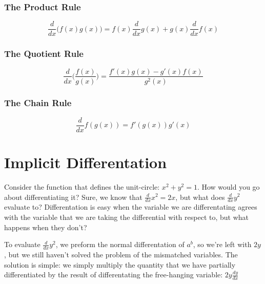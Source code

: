 \subsubsection{The Product Rule}
\begin{equation}
\frac{d}{dx}\big(f(x)g(x)\big)=f(x)\frac{d}{dx}g(x)+g(x)\frac{d}{dx}f(x)
\end{equation}

\subsubsection{The Quotient Rule}
\begin{equation}
\frac{d}{dx}\Bigg(\frac{f(x)}{g(x)}\Bigg)=\frac{f'(x)g(x)-g'(x)f(x)}{g^2(x)}
\end{equation}

\subsubsection{The Chain Rule}
\begin{equation}
\frac{d}{dx}f(g(x))=f'(g(x))g'(x)
\end{equation}

\section{Implicit Differentation}
Consider the function that defines the unit-circle: $x^2+y^2=1$.  How would you
go about differentiating it?  Sure, we know that $\frac{d}{dx}x^2=2x$, but what
does $\frac{d}{dx}y^2$ evaluate to?  Differentation is easy when the variable we
are differentating agrees with the variable that we are taking the differential
with respect to, but what happens when they don't?

To evaluate $\frac{d}{dx}y^2$, we preform the normal differentation of $a^b$, so
we're left with $2y$, but we still haven't solved the problem of the mismatched
variables.  The solution is simple: we simply multiply the quantity that we have
partially differentiated by the result of differentating the free-hanging
variable: $2y\frac{dy}{dx}$
